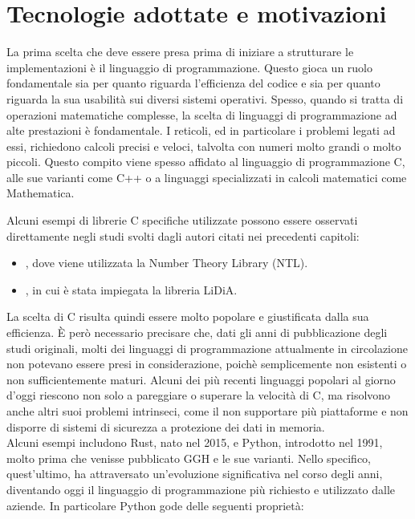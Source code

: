 \section{Tecnologie adottate e motivazioni}
\label{sec:motivations}
La prima scelta che deve essere presa prima di iniziare a strutturare
le implementazioni è il linguaggio di programmazione.
Questo gioca un ruolo fondamentale sia per quanto riguarda l'efficienza del codice e sia 
per quanto riguarda la sua usabilità sui diversi sistemi operativi. Spesso, quando si tratta 
di operazioni matematiche complesse, la scelta di linguaggi di programmazione ad alte 
prestazioni è fondamentale. I reticoli, ed in particolare i problemi legati ad essi, richiedono
calcoli precisi e veloci, talvolta con numeri molto grandi o molto piccoli.
Questo compito viene spesso affidato al linguaggio di programmazione C, alle sue varianti
come C++ o a linguaggi specializzati in calcoli matematici come Mathematica. 

Alcuni esempi di librerie C specifiche utilizzate possono essere osservati direttamente 
negli studi svolti dagli autori citati nei precedenti capitoli:
\begin{itemize}
    \item \cite{HNF01,HNF04,Nguyen400}, dove viene utilizzata la Number Theory Library (NTL).
    \item \cite{GGH97, Nguyen99}, in cui è stata impiegata la libreria LiDiA.
\end{itemize}

La scelta di C risulta quindi essere molto popolare e giustificata dalla sua efficienza. 
È però necessario precisare che, dati gli anni di pubblicazione degli studi originali, molti
dei linguaggi di programmazione attualmente in circolazione non potevano essere presi 
in considerazione, poichè semplicemente non esistenti o non sufficientemente maturi. 
Alcuni dei più recenti linguaggi
popolari al giorno d'oggi riescono non solo a pareggiare o superare la velocità di C, ma
risolvono anche altri suoi problemi intrinseci, come il non supportare più piattaforme e 
non disporre di sistemi di sicurezza a protezione dei dati in memoria. \\
Alcuni esempi includono Rust, nato nel 2015, e Python, introdotto nel 1991, molto prima 
che venisse pubblicato GGH e le sue varianti. Nello specifico, quest'ultimo, ha attraversato 
un'evoluzione significativa nel corso degli anni, diventando oggi il linguaggio 
di programmazione più richiesto e utilizzato dalle aziende.
In particolare Python gode delle seguenti proprietà:

